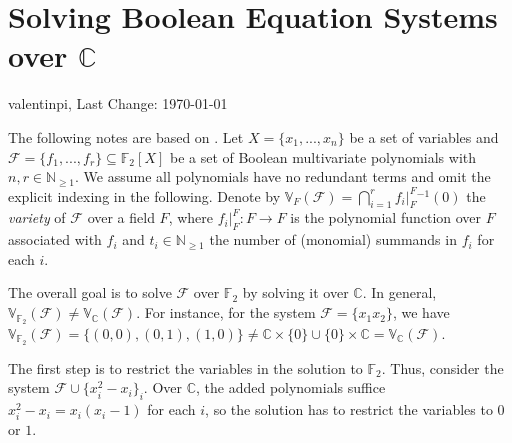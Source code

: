 \documentclass[10pt]{amsart}
\theoremstyle{definition}
\theoremstyle{remark}
\begin{document}
    \section*{Solving Boolean Equation Systems over \(\mathbb{C}\)} \hfill \hfill valentinpi, Last Change: \today{}

    \phantom{}

    The following notes are based on \cite{Chen_2021}. Let \(X = \{x_1, ..., x_n\}\) be a set of variables and \(\mathcal{F} = \{f_1, ..., f_r\} \subseteq \mathbb{F}_2[X]\) be a set of Boolean multivariate polynomials with \(n, r \in \mathbb{N}_{\geq 1}\). We assume all polynomials have no redundant terms and omit the explicit indexing in the following. Denote by \(\mathbb{V}_F(\mathcal{F}) = \bigcap_{i=1}^r f_i|_F^F{}^{-1}(0)\) the \emph{variety} of \(\mathcal{F}\) over a field \(F\), where \(f_i|_F^F\colon F \to F\) is the polynomial function over \(F\) associated with \(f_i\) and \(t_i \in \mathbb{N}_{\geq 1}\) the number of (monomial) summands in \(f_i\) for each \(i\).

    \phantom{}

    The overall goal is to solve \(\mathcal{F}\) over \(\mathbb{F}_2\) by solving it over \(\mathbb{C}\). In general, \(\mathbb{V}_{\mathbb{F}_2}(\mathcal{F}) \neq \mathbb{V}_{\mathbb{C}}(\mathcal{F})\). For instance, for the system \(\mathcal{F} = \{x_1x_2\}\), we have \(\mathbb{V}_{\mathbb{F}_2}(\mathcal{F}) = \{(0, 0), (0, 1), (1, 0)\} \neq \mathbb{C} \times \{0\} \cup \{0\} \times \mathbb{C} = \mathbb{V}_{\mathbb{C}}(\mathcal{F})\).

    \phantom{}

    The first step is to restrict the variables in the solution to \(\mathbb{F}_2\). Thus, consider the system \(\mathcal{F} \cup \{x_i^2-x_i\}_i\). Over \(\mathbb{C}\), the added polynomials suffice \(x_i^2-x_i = x_i(x_i-1)\) for each \(i\), so the solution has to restrict the variables to \(0\) or \(1\).

    \phantom{}
\end{document}
